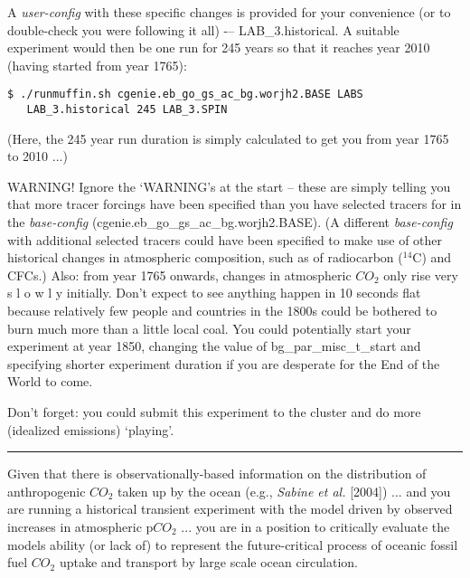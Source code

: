 \documentclass[11pt,fleqn]{book} %
\begin{document}
A \textit{user-config} with these specific changes is provided for your convenience (or to double-check you were following it all) -– \footnotesize\textsf{LAB\_3.historical}\normalsize. A suitable experiment would then be one run for 245 years so that it reaches year 2010 (having started from year 1765): 
\vspace{-2pt}\begin{verbatim}
$ ./runmuffin.sh cgenie.eb_go_gs_ac_bg.worjh2.BASE LABS
   LAB_3.historical 245 LAB_3.SPIN
\end{verbatim}\vspace{-2pt}
(Here, the 245 year run duration is simply calculated to get you from year 1765 to 2010 ...)

WARNING! Ignore the ‘WARNING’s at the start -- these are simply telling you that more tracer forcings have been specified than you have selected tracers for in the \textit{base-config} (cgenie.eb\_go\_gs\_ac\_bg.worjh2.BASE). (A different \textit{base-config} with additional selected tracers could have been specified to make use of other historical changes in atmospheric composition, such as of radiocarbon ($^{14}$C) and CFCs.) Also: from year 1765 onwards, changes in atmospheric \(CO_{2}\) only rise very s l o w l y initially. Don’t expect to see anything happen in 10 seconds flat because relatively few people and countries in the 1800s could be bothered to burn much more than a little local coal. You could potentially start your experiment at year 1850, changing the value of bg\_par\_misc\_t\_start and specifying shorter experiment duration if you are desperate for the End of the World to come.

Don’t forget: you could submit this experiment to the cluster and do more (idealized emissions) ‘playing’.

\vspace{1mm}
\noindent\rule{4cm}{0.1mm}
\vspace{2mm}

\noindent Given that there is observationally-based information on the distribution of anthropogenic \(CO_{2}\) taken up by the ocean (e.g., \textit{Sabine et al.} [2004]) ... and you are running a historical transient experiment with the model driven by observed increases in atmospheric p\(CO_{2}\) ... you are in a position to critically evaluate the models ability (or lack of) to represent the future-critical process of oceanic fossil fuel \(CO_{2}\) uptake and transport by large scale ocean circulation.
\end{document}

